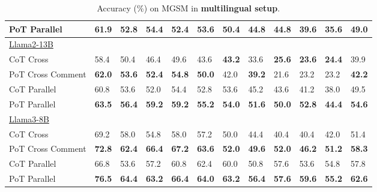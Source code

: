 \begin{table*}[htbp]
{\begin{tabular}{l|llllllllll|l}
PoT Parallel & \textbf{61.9} & \textbf{52.8} & \textbf{54.4} & \textbf{52.4} & \textbf{53.6} & \textbf{50.4} & \textbf{44.8} & \textbf{44.8} & \textbf{39.6} & \textbf{35.6} & \textbf{49.0} \\
\hline
\multicolumn{1}{l|}{\underline{Llama2-13B}} & & & & & & & & & & & \\
CoT Cross & 58.4 & 50.4 & 46.4 & 49.6 & 43.6 & \textbf{43.2} & 33.6 & \textbf{25.6} & \textbf{23.6} & \textbf{24.4} & 39.9 \\
PoT Cross Comment & \textbf{62.0} & \textbf{53.6} & \textbf{52.4} & \textbf{54.8} & \textbf{50.0} & 42.0 & \textbf{39.2} & 21.6 & 23.2 & 23.2 & \textbf{42.2} \\
\hdashline
CoT Parallel & 60.8 & 53.6 & 52.0 & 54.4 & 52.8 & 53.6 & 45.2 & 43.6 & 41.2 & 38.0 & 49.5 \\
PoT Parallel & \textbf{63.5} & \textbf{56.4} & \textbf{59.2} & \textbf{59.2} & \textbf{55.2} & \textbf{54.0} & \textbf{51.6} & \textbf{50.0} & \textbf{52.8} & \textbf{44.4} & \textbf{54.6} \\
\hline
\multicolumn{1}{l|}{\underline{Llama3-8B}} & & & & & & & & & & & \\
CoT Cross & 69.2 & 58.0 & 54.8 & 58.0 & 57.2 & 50.0 & 44.4 & 40.4 & 40.4 & 42.0 & 51.4 \\
PoT Cross Comment & \textbf{72.8} & \textbf{62.4} & \textbf{66.4} & \textbf{67.2} & \textbf{63.6} & \textbf{52.0} & \textbf{49.6} & \textbf{52.0} & \textbf{46.2} & \textbf{51.2} & \textbf{58.3} \\
\hdashline
CoT Parallel & 66.8 & 53.6 & 57.2 & 60.8 & 62.4 & 60.0 & 50.8 & 57.6 & 53.6 & 54.8 & 57.8 \\
PoT Parallel & \textbf{76.5} & \textbf{64.4} & \textbf{63.2} & \textbf{66.4} & \textbf{64.0} & \textbf{63.2} & \textbf{56.4} & \textbf{57.6} & \textbf{59.6} & \textbf{55.2} & \textbf{62.6} \\
\hline
\end{tabular}
}
\caption{
Accuracy (\%) on MGSM in \textbf{multilingual setup}. 
}
\label{tab:main-multi}
\vspace{-3mm}
\end{table*}










